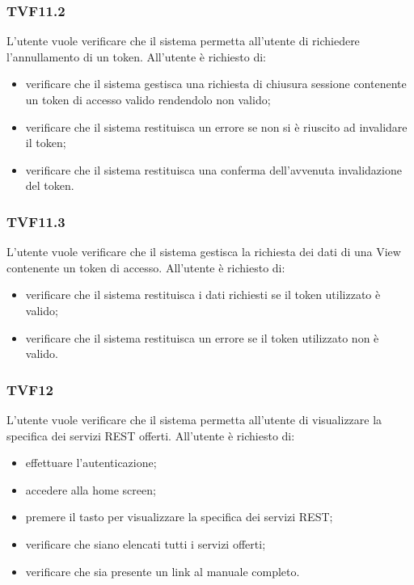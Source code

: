 		\subsubsection{TVF11.2}
			L'utente vuole verificare che il sistema permetta all'utente di richiedere l'annullamento di un token. All'utente è richiesto di:
			\begin{itemize}
				\item verificare che il sistema gestisca una richiesta di chiusura sessione contenente un token di accesso valido rendendolo non valido;
				\item verificare che il sistema restituisca un errore se non si è riuscito ad invalidare il token;
				\item verificare che il sistema restituisca una conferma dell'avvenuta invalidazione del token.
			\end{itemize}
			
		\subsubsection{TVF11.3}
			L'utente vuole verificare che il sistema gestisca la richiesta dei dati di una View contenente un token di accesso. All'utente è richiesto di:
			\begin{itemize}
				\item verificare che il sistema restituisca i dati richiesti se il token utilizzato è valido;
				\item verificare che il sistema restituisca un errore se il token utilizzato non è valido.
			\end{itemize}
			
		\subsubsection{TVF12}
			L'utente vuole verificare che il sistema permetta all'utente di visualizzare la specifica dei servizi REST offerti. All'utente è richiesto di:
			\begin{itemize}
				\item effettuare l'autenticazione;
				\item accedere alla home screen;
				\item premere il tasto per visualizzare la specifica dei servizi REST;
				\item verificare che siano elencati tutti i servizi offerti;
				\item verificare che sia presente un link al manuale completo.
			\end{itemize}
			
